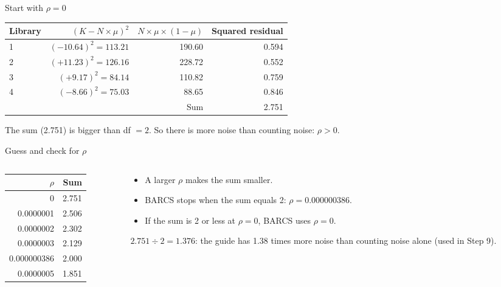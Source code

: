 \documentclass[aspectratio=169,11pt]{beamer}
\begin{document}
\begin{frame}{Start with \texorpdfstring{$\rho = 0$}{rho = 0}}
\begin{worked}[ 11]
\centering\small
\begin{tabular}{@{}lrrr@{}}
\toprule
Library & $(K - N \times \mu)^2$ & $N \times \mu \times (1-\mu)$ & Squared residual\\
\midrule
1 & $(-10.64)^2 = 113.21$ & 190.60 & 0.594\\
2 & $(+11.23)^2 = 126.16$ & 228.72 & 0.552\\
3 & $(+9.17)^2 = 84.14$   & 110.82 & 0.759\\
4 & $(-8.66)^2 = 75.03$   &  88.65 & 0.846\\
\midrule
  &  & Sum & 2.751\\
\bottomrule
\end{tabular}

\raggedright
The sum (2.751) is bigger than df $= 2$. So there is more noise than
counting noise: $\rho > 0$.
\end{worked}
\end{frame}

\begin{frame}{Guess and check for \texorpdfstring{$\rho$}{rho}}
\begin{columns}[T]
\begin{column}{0.42\textwidth}
\centering
\begin{tabular}{@{}rr@{}}
\toprule
$\rho$ & Sum\\
\midrule
0           & 2.751\\
0.0000001   & 2.506\\
0.0000002   & 2.302\\
0.0000003   & 2.129\\
\alert{0.000000386} & \alert{2.000}\\
0.0000005   & 1.851\\
\bottomrule
\end{tabular}
\end{column}
\begin{column}{0.54\textwidth}
\begin{itemize}
\item A larger $\rho$ makes the sum smaller.
\item BARCS stops when the sum equals 2: $\rho = 0.000000386$.
\item If the sum is 2 or less at $\rho = 0$, BARCS uses $\rho = 0$.
\end{itemize}
\begin{symbols}
\small $2.751 \div 2 = 1.376$: the guide has 1.38 times more noise than
counting noise alone (used in Step 9).
\end{symbols}
\end{column}
\end{columns}
\end{frame}
\end{document}
